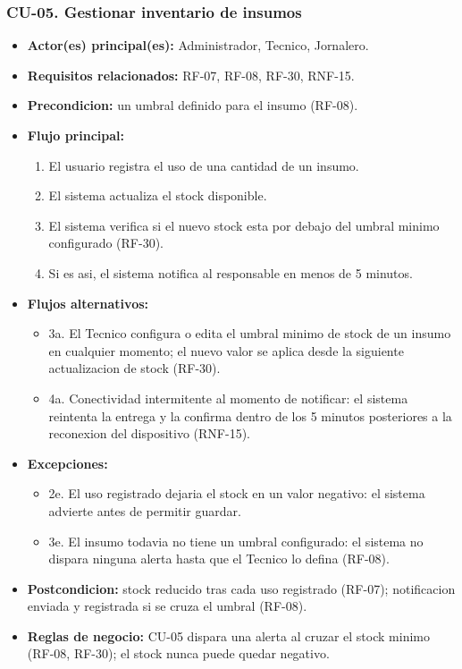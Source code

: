 \documentclass[11pt,a4paper]{article}
\begin{document}
\subsubsection{CU-05. Gestionar inventario de insumos}
\begin{itemize}
\item \textbf{Actor(es) principal(es):} Administrador, Tecnico, Jornalero.
\item \textbf{Requisitos relacionados:} RF-07, RF-08, RF-30, RNF-15.
\item \textbf{Precondicion:} un umbral definido para el insumo (RF-08).
\item \textbf{Flujo principal:}
  \begin{enumerate}
  \item El usuario registra el uso de una cantidad de un insumo.
  \item El sistema actualiza el stock disponible.
  \item El sistema verifica si el nuevo stock esta por debajo del umbral minimo configurado (RF-30).
  \item Si es asi, el sistema notifica al responsable en menos de 5 minutos.
  \end{enumerate}
\item \textbf{Flujos alternativos:}
  \begin{itemize}
  \item 3a. El Tecnico configura o edita el umbral minimo de stock de un insumo en cualquier momento; el nuevo valor se aplica desde la siguiente actualizacion de stock (RF-30).
  \item 4a. Conectividad intermitente al momento de notificar: el sistema reintenta la entrega y la confirma dentro de los 5 minutos posteriores a la reconexion del dispositivo (RNF-15).
  \end{itemize}
\item \textbf{Excepciones:}
  \begin{itemize}
  \item 2e. El uso registrado dejaria el stock en un valor negativo: el sistema advierte antes de permitir guardar.
  \item 3e. El insumo todavia no tiene un umbral configurado: el sistema no dispara ninguna alerta hasta que el Tecnico lo defina (RF-08).
  \end{itemize}
\item \textbf{Postcondicion:} stock reducido tras cada uso registrado (RF-07); notificacion enviada y registrada si se cruza el umbral (RF-08).
\item \textbf{Reglas de negocio:} CU-05 dispara una alerta al cruzar el stock minimo (RF-08, RF-30); el stock nunca puede quedar negativo.
\end{itemize}
\end{document}
